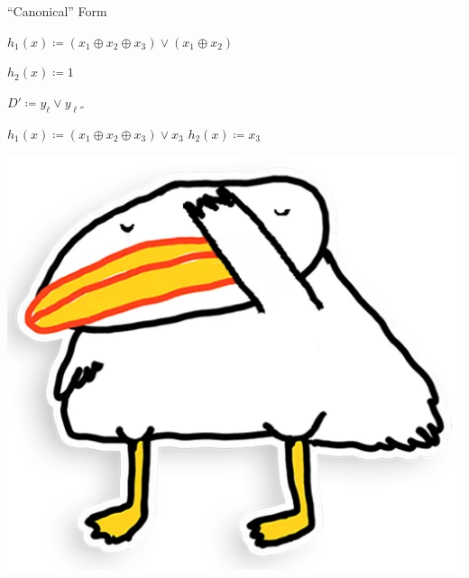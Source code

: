\begin{frame}{``Canonical'' Form}
\begin{minipage}{0.4\linewidth}
        $h_1(x) \coloneqq (x_1 \oplus x_2 \oplus x_3) \lor (x_1 \oplus x_2)$
        
        $h_2(x) \coloneqq 1$
    \end{minipage}
    \begin{minipage}{0.4\linewidth}
        \centering
        $D' \coloneqq y_{\ell} \lor y_{\ell''}$
        
        $h_1(x) \coloneqq (x_1 \oplus x_2 \oplus x_3) \lor x_3$
        $h_2(x) \coloneqq x_3$
    \end{minipage}

    \pause
    \vspace{0.2cm}
    \centering
    \includegraphics[scale = 0.1]{pics/utia-shame.png}
\end{frame}



